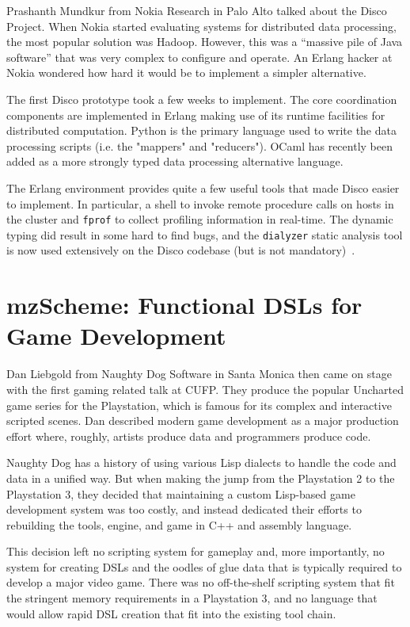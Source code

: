 \documentclass{jfp1}
\begin{document}
Prashanth Mundkur from Nokia Research in Palo Alto talked about the
Disco Project.  When Nokia started evaluating systems for distributed
data processing, the most popular solution was Hadoop. However,
this was a ``massive pile of Java software'' that was very complex to
configure and operate. An Erlang hacker at Nokia wondered how hard it
would be to implement a simpler alternative.

The first Disco prototype took a few weeks to implement. The core
coordination components are implemented in Erlang making use of its
runtime facilities for distributed computation. Python is the primary
language used to write the data processing scripts (i.e. the "mappers"
and "reducers"). OCaml has recently been added as a more strongly typed
data processing alternative language.

The Erlang environment provides quite a few useful tools that made Disco
easier to implement. In particular, a shell to invoke remote procedure calls on
hosts in the cluster and {\tt fprof} to collect profiling information in
real-time. The dynamic typing did result in some hard to find bugs, and
the {\tt dialyzer} static analysis tool is now used extensively on the Disco
codebase (but is not mandatory)~\cite{Sagonas:2007:DDE:1273920.1273926}.

\section{mzScheme: Functional DSLs for Game Development}

Dan Liebgold from Naughty Dog Software in Santa Monica then came on
stage with the first gaming related talk at CUFP. They produce the
popular Uncharted game series for the Playstation, which is famous for
its complex and interactive scripted scenes.  Dan described modern game
development as a major production effort where, roughly, artists produce
data and programmers produce code.

Naughty Dog has a history of using various Lisp dialects to handle the
code and data in a unified way. But when making the jump from the
Playstation 2 to the Playstation 3, they decided that maintaining a
custom Lisp-based game development system was too costly, and instead
dedicated their efforts to rebuilding the tools, engine, and game in C++
and assembly language.

This decision left no scripting system for gameplay and, more
importantly, no system for creating DSLs and the oodles of glue data
that is typically required to develop a major video game. There was no
off-the-shelf scripting system that fit the stringent memory
requirements in a Playstation 3, and no language that would allow rapid
DSL creation that fit into the existing tool chain.
\end{document}
